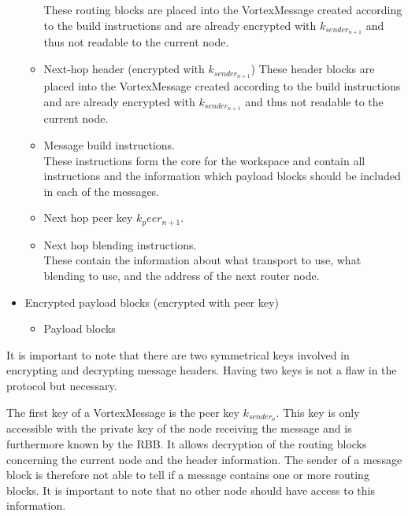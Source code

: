 \documentclass[10pt,journal,compsoc]{IEEEtran}
\begin{document}
\begin{itemize}
\begin{itemize}
		These routing blocks are placed into the VortexMessage created according to the build instructions and are already encrypted with $k_{sender_{n+1}}$ and thus not readable to the current node.
		\item Next-hop header (encrypted with $k_{sender_{n+1}}$)
		These header blocks are placed into the VortexMessage created according to the build instructions and are already encrypted with $k_{sender_{n+1}}$ and thus not readable to the current node.
		\item Message build instructions.\\
		These instructions form the core for the workspace and contain all instructions and the information which payload blocks should be included in each of the messages.
		\item Next hop peer key $k_peer_{n+1}$.
		\item Next hop blending instructions.\\
		These contain the information about what transport to use, what blending to use, and the address of the next router node.
	\end{itemize}
	\item Encrypted payload blocks (encrypted with peer key)
	\begin{itemize}
		\item Payload blocks
	\end{itemize}
\end{itemize}

It is important to note that there are two symmetrical keys involved in encrypting and decrypting message headers. Having two keys is not a flaw in the protocol but necessary. 

The first key of a VortexMessage is the peer key $k_{sender_n}$. This key is only accessible with the private key of the node receiving the message and is furthermore known by the RBB. It allows decryption of the routing blocks concerning the current node and the header information. The sender of a message block is therefore not able to tell if a message contains one or more routing blocks. It is important to note that no other node should have access to this information. 
\end{document}
